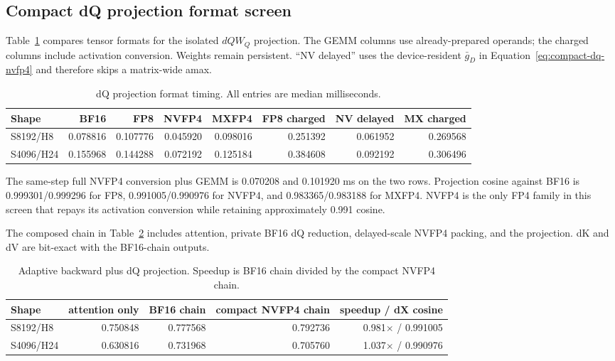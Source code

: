 \subsection{Compact dQ projection format screen}

Table~\ref{tab:dq-projection-format} compares tensor formats for the isolated
$dQW_Q$ projection.  The GEMM columns use already-prepared operands; the
charged columns include activation conversion.  Weights remain persistent.
``NV delayed'' uses the device-resident $\bar g_D$ in
Equation~\ref{eq:compact-dq-nvfp4} and therefore skips a matrix-wide amax.

\begin{table}[htbp]
\centering
\caption{dQ projection format timing.  All entries are median milliseconds.}
\label{tab:dq-projection-format}
\scriptsize
\begin{tabular}{l rrrr rrr}
\toprule
Shape & BF16 & FP8 & NVFP4 & MXFP4 & FP8 charged & NV delayed & MX charged \\
\midrule
S8192/H8  & 0.078816 & 0.107776 & 0.045920 & 0.098016 & 0.251392 & 0.061952 & 0.269568 \\
S4096/H24 & 0.155968 & 0.144288 & 0.072192 & 0.125184 & 0.384608 & 0.092192 & 0.306496 \\
\bottomrule
\end{tabular}
\end{table}

The same-step full NVFP4 conversion plus GEMM is 0.070208 and 0.101920 ms on
the two rows.  Projection cosine against BF16 is 0.999301/0.999296 for FP8,
0.991005/0.990976 for NVFP4, and 0.983365/0.983188 for MXFP4.  NVFP4 is the
only FP4 family in this screen that repays its activation conversion while
retaining approximately 0.991 cosine.

The composed chain in Table~\ref{tab:compact-dq-chain} includes attention,
private BF16 dQ reduction, delayed-scale NVFP4 packing, and the projection.
dK and dV are bit-exact with the BF16-chain outputs.

\begin{table}[htbp]
\centering
\caption{Adaptive backward plus dQ projection.  Speedup is BF16 chain divided
by the compact NVFP4 chain.}
\label{tab:compact-dq-chain}
\small
\begin{tabular}{l rrrr}
\toprule
Shape & attention only & BF16 chain & compact NVFP4 chain & speedup / dX cosine \\
\midrule
S8192/H8  & 0.750848 & 0.777568 & 0.792736 & 0.981$\times$ / 0.991005 \\
S4096/H24 & 0.630816 & 0.731968 & 0.705760 & 1.037$\times$ / 0.990976 \\
\bottomrule
\end{tabular}
\end{table}

